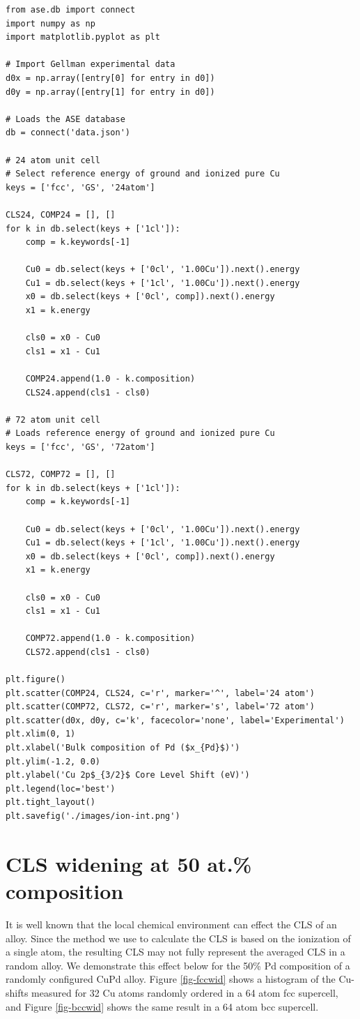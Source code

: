 \documentclass[number, sort&compress, review, 12pt]{elsarticle}
\begin{document}
\begin{verbatim}
from ase.db import connect
import numpy as np
import matplotlib.pyplot as plt

# Import Gellman experimental data
d0x = np.array([entry[0] for entry in d0])
d0y = np.array([entry[1] for entry in d0])

# Loads the ASE database
db = connect('data.json')

# 24 atom unit cell
# Select reference energy of ground and ionized pure Cu
keys = ['fcc', 'GS', '24atom']

CLS24, COMP24 = [], []
for k in db.select(keys + ['1cl']):
    comp = k.keywords[-1]

    Cu0 = db.select(keys + ['0cl', '1.00Cu']).next().energy
    Cu1 = db.select(keys + ['1cl', '1.00Cu']).next().energy
    x0 = db.select(keys + ['0cl', comp]).next().energy
    x1 = k.energy

    cls0 = x0 - Cu0
    cls1 = x1 - Cu1

    COMP24.append(1.0 - k.composition)
    CLS24.append(cls1 - cls0)

# 72 atom unit cell
# Loads reference energy of ground and ionized pure Cu
keys = ['fcc', 'GS', '72atom']

CLS72, COMP72 = [], []
for k in db.select(keys + ['1cl']):
    comp = k.keywords[-1]

    Cu0 = db.select(keys + ['0cl', '1.00Cu']).next().energy
    Cu1 = db.select(keys + ['1cl', '1.00Cu']).next().energy
    x0 = db.select(keys + ['0cl', comp]).next().energy
    x1 = k.energy

    cls0 = x0 - Cu0
    cls1 = x1 - Cu1

    COMP72.append(1.0 - k.composition)
    CLS72.append(cls1 - cls0)

plt.figure()
plt.scatter(COMP24, CLS24, c='r', marker='^', label='24 atom')
plt.scatter(COMP72, CLS72, c='r', marker='s', label='72 atom')
plt.scatter(d0x, d0y, c='k', facecolor='none', label='Experimental')
plt.xlim(0, 1)
plt.xlabel('Bulk composition of Pd ($x_{Pd}$)')
plt.ylim(-1.2, 0.0)
plt.ylabel('Cu 2p$_{3/2}$ Core Level Shift (eV)')
plt.legend(loc='best')
plt.tight_layout()
plt.savefig('./images/ion-int.png')
\end{verbatim}

\section{CLS widening at 50 at.\% composition}
\label{sec-6}
It is well known that the local chemical environment can effect the CLS of an alloy. Since the method we use to calculate the CLS is based on the ionization of a single atom, the resulting CLS may not fully represent the averaged CLS in a random alloy. We demonstrate this effect below for the 50\% Pd composition of a randomly configured CuPd alloy. Figure \ref{fig-fccwid} shows a histogram of the Cu-shifts measured for 32 Cu atoms randomly ordered in a 64 atom fcc supercell, and Figure \ref{fig-bccwid} shows the same result in a 64 atom bcc supercell.
\end{document}
